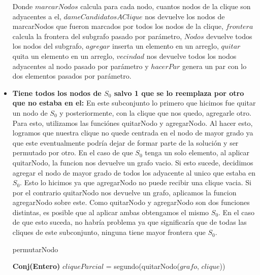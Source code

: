 \begin{itemize}
Donde $marcarNodos$ calcula para cada nodo, cuantos nodos de la clique son adyacentes a el, $dameCandidatosAClique$ nos devuelve los nodos de marcarNodos que fueron marcados por todos los nodos de la clique, $frontera$ calcula la frontera del subgrafo pasado por parámetro, $Nodos$ devuelve todos los nodos del subgrafo, $agregar$ inserta un elemento en un arreglo, $quitar$ quita un elemento en un arreglo, $vecindad$ nos devuelve todos los nodos adyacentes al nodo pasado por parámetro y $hacerPar$ genera un par con lo dos elementos pasados por parámetro. \newline

\item \textbf{Tiene todos los nodos de $S_{0}$ salvo 1 que se lo reemplaza por otro que no estaba en el:} \newline
En este subconjunto lo primero que hicimos fue quitar un nodo de $S_{0}$ y posteriormente, con la clique que nos quedo, agregarle otro. Para esto, utilizamos las funciónes quitarNodo y agregarNodo. Al hacer esto, logramos que nuestra clique no quede centrada en el nodo de mayor grado ya que este eventualmente podría dejar de formar parte de la solución y ser permutado por otro.\newline
En el caso de que $S_{0}$ tenga un solo elemento, al aplicar quitarNodo, la funcion nos devuelve un grafo vacio. Si esto sucede, decidimos agregar el nodo de mayor grado de todos los adyacente al unico que estaba en $S_{0}$. Esto lo hicimos ya que agregarNodo no puede recibir una clique vacia.\newline
Si por el contrario quitarNodo nos devuelve un grafo, aplicamos la funcion agregarNodo sobre este. \newline
Como quitarNodo y agregarNodo son dos funciones distintas, es posible que al aplicar ambas obtengamos el mismo $S_{0}$. En el caso de que esto suceda, no habría problema ya que significaría que de todas las cliques de este subconjunto, ninguna tiene mayor frontera que $S_{0}$.
\begin{algorithm}[H]
    \SetAlgoLined
    \caption{permutarNodo}
	
   \textbf{Conj(Entero)} $cliqueParcial$ = segundo(quitarNodo($grafo$, $clique$)) \\



\end{algorithm}
\end{itemize}
